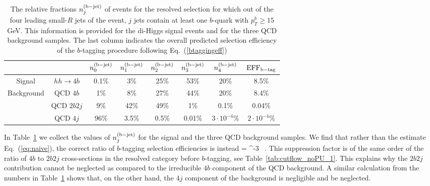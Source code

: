 \begin{table}[t]
  \centering
  \small
  \begin{tabular}{|c|c|c|c|c|c|c|c|}
    \hline
  \multicolumn{2}{|c|}{}   &  $n^{\rm (b-jet)}_0$  &  $n^{\rm (b-jet)}_1$  &  $n^{\rm (b-jet)}_2$  & $n^{\rm (b-jet)}_3$ &
    $n^{\rm (b-jet)}_4$ & ${\rm EFF}_{\rm b-tag}$ \\
    \hline
    \hline
    Signal  &  $hh\to 4b$  &   0.1\%    & 3\%     &  25\%     & 53\%     & 20\%      & 8.5\%  \\
    \hline
    \multirow{3}{*}{Background}  &  QCD $4b$  & 1\%      &  8\%    &   27\%   &  44\%     & 20\%       &  8.4\% \\
     &  QCD $2b2j$  &   9\%    & 42\%     &  49\%    & 1\%     &  0.1\%     & 0.04\%  \\
    &  QCD $4j$  &   96\%    &  3.5\%     & 0.5\%     &  0.01\%    & $3\cdot 10^{-4}$\%      &
    $2\cdot 10^{-4}$\%\\
    \hline
  \end{tabular}
  \caption{\small
    The relative fractions  $n^{\rm (b-jet)}_j$ of events for the resolved selection
    for which out of the four leading small-$R$ jets of the
    event, $j$ jets
    contain at least one $b$-quark with $p_T^b\ge 15$ GeV.
    This information is provided
    for the di-Higgs signal events and for the three QCD background samples.
    The last column indicates the overall predicted
    selection efficiency of the $b$-tagging procedure following
    Eq.~(\ref{btaggingeff})
    \label{tab:btaggingcheck}
  }
  \end{table}

In Table~\ref{tab:btaggingcheck} we collect
the values of $n^{\rm (b-jet)}_j$ for the signal and the three QCD background samples.
%
We find that rather than the estimate Eq.~(\ref{eq:naive}),
the correct ratio of $b$-tagging selection efficiencies is instead
\be
{}=
   ^{-3} \, .
  \ee
  This suppression factor is of the same order of the ratio of $4b$ to $2b2j$ cross-sections
  in the resolved category before $b$-tagging, see Table~\ref{tab:cutflow_noPU_1}.
    This explains why the $2b2j$ contribution cannot be neglected as compared
    to the irreducible $4b$ component of the QCD background.
    A similar calculation from the numbers in Table~\ref{tab:btaggingcheck} shows
    that, on the other hand, the $4j$ component of the background is negligible and be neglected. %
    

